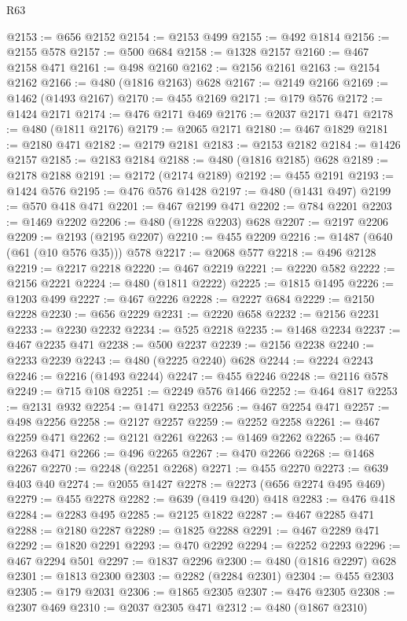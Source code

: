 \begin{lexlean}{R63}
\begin{coremodule}
@2153 := @656 @2152
@2154 := @2153 @499
@2155 := @492 @1814
@2156 := @2155 @578
@2157 := @500 @684
@2158 := @1328 @2157
@2160 := @467 @2158 @471
@2161 := @498 @2160
@2162 := @2156 @2161
@2163 := @2154 @2162
@2166 := @480 (@1816 @2163) @628
@2167 := @2149 @2166
@2169 := @1462 (@1493 @2167)
@2170 := @455 @2169
@2171 := @179 @576
@2172 := @1424 @2171
@2174 := @476 @2171 @469
@2176 := @2037 @2171 @471
@2178 := @480 (@1811 @2176)
@2179 := @2065 @2171
@2180 := @467 @1829
@2181 := @2180 @471
@2182 := @2179 @2181
@2183 := @2153 @2182
@2184 := @1426 @2157
@2185 := @2183 @2184
@2188 := @480 (@1816 @2185) @628
@2189 := @2178 @2188
@2191 := @2172 (@2174 @2189)
@2192 := @455 @2191
@2193 := @1424 @576
@2195 := @476 @576 @1428
@2197 := @480 (@1431 @497)
@2199 := @570 @418 @471
@2201 := @467 @2199 @471
@2202 := @784 @2201
@2203 := @1469 @2202
@2206 := @480 (@1228 @2203) @628
@2207 := @2197 @2206
@2209 := @2193 (@2195 @2207)
@2210 := @455 @2209
@2216 := @1487 (@640 (@61 (@10 @576 @35))) @578
@2217 := @2068 @577
@2218 := @496 @2128
@2219 := @2217 @2218
@2220 := @467 @2219
@2221 := @2220 @582
@2222 := @2156 @2221
@2224 := @480 (@1811 @2222)
@2225 := @1815 @1495
@2226 := @1203 @499
@2227 := @467 @2226
@2228 := @2227 @684
@2229 := @2150 @2228
@2230 := @656 @2229
@2231 := @2220 @658
@2232 := @2156 @2231
@2233 := @2230 @2232
@2234 := @525 @2218
@2235 := @1468 @2234
@2237 := @467 @2235 @471
@2238 := @500 @2237
@2239 := @2156 @2238
@2240 := @2233 @2239
@2243 := @480 (@2225 @2240) @628
@2244 := @2224 @2243
@2246 := @2216 (@1493 @2244)
@2247 := @455 @2246
@2248 := @2116 @578
@2249 := @715 @108
@2251 := @2249 @576 @1466
@2252 := @464 @817
@2253 := @2131 @932
@2254 := @1471 @2253
@2256 := @467 @2254 @471
@2257 := @498 @2256
@2258 := @2127 @2257
@2259 := @2252 @2258
@2261 := @467 @2259 @471
@2262 := @2121 @2261
@2263 := @1469 @2262
@2265 := @467 @2263 @471
@2266 := @496 @2265
@2267 := @470 @2266
@2268 := @1468 @2267
@2270 := @2248 (@2251 @2268)
@2271 := @455 @2270
@2273 := @639 @403 @40
@2274 := @2055 @1427
@2278 := @2273 (@656 @2274 @495 @469)
@2279 := @455 @2278
@2282 := @639 (@419 @420) @418
@2283 := @476 @418
@2284 := @2283 @495
@2285 := @2125 @1822
@2287 := @467 @2285 @471
@2288 := @2180 @2287
@2289 := @1825 @2288
@2291 := @467 @2289 @471
@2292 := @1820 @2291
@2293 := @470 @2292
@2294 := @2252 @2293
@2296 := @467 @2294 @501
@2297 := @1837 @2296
@2300 := @480 (@1816 @2297) @628
@2301 := @1813 @2300
@2303 := @2282 (@2284 @2301)
@2304 := @455 @2303
@2305 := @179 @2031
@2306 := @1865 @2305
@2307 := @476 @2305
@2308 := @2307 @469
@2310 := @2037 @2305 @471
@2312 := @480 (@1867 @2310)

\end{coremodule}
\end{lexlean}
